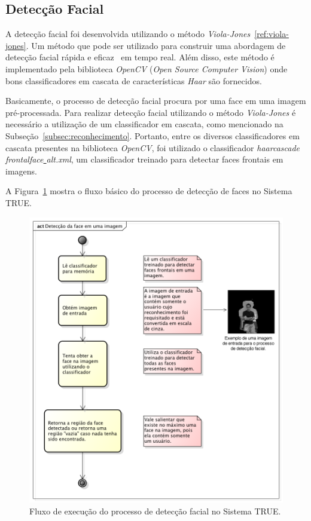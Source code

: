 	\subsection{Detecção Facial}

		A detecção facial foi desenvolvida utilizando o método \textit{Viola-Jones}~\ref{ref:viola-jones}. Um método que pode ser utilizado para construir uma abordagem de detecção facial rápida e eficaz~\cite{violajones} em tempo real. Além disso, este método é implementado pela biblioteca \textit{OpenCV} (\textit{Open Source Computer Vision}) onde bons classificadores em cascata de características \textit{Haar} são fornecidos.

		Basicamente, o processo de detecção facial procura por uma face em uma imagem pré-processada. Para realizar detecção facial utilizando o método \textit{Viola-Jones} é necessário a utilização de um classificador em cascata, como mencionado na Subseção~\ref{subsec:reconhecimento}. Portanto, entre os diversos classificadores em cascata presentes na biblioteca \textit{OpenCV}, foi utilizado o classificador \textit{haarcascade\underline{ }frontalface\underline{ }alt.xml}, um classificador treinado para detectar faces frontais em imagens.

		A Figura~\ref{fig:diagrama-deteccao} mostra o fluxo básico do processo de detecção de faces no Sistema TRUE.

			\begin{figure}[H]
			\begin{center}
				\includegraphics[scale=0.5]{figuras/4.ProblemaEProposta/diagrama-detectar-face.png}
			\end{center}
			\caption{Fluxo de execução do processo de detecção facial no Sistema TRUE.}
			\label{fig:diagrama-deteccao}
		\end{figure}


